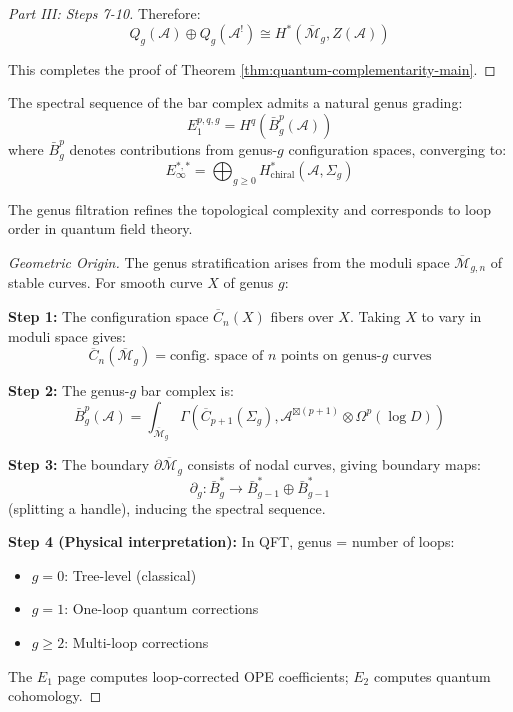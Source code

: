 \begin{proof}[Part III: Steps 7-10]
Therefore:
\begin{equation}
\boxed{Q_g(\mathcal{A}) \oplus Q_g(\mathcal{A}^!) \cong H^*(\overline{\mathcal{M}}_g, 
Z(\mathcal{A}))}
\end{equation}

This completes the proof of Theorem \ref{thm:quantum-complementarity-main}. \qedhere

\end{proof}

\begin{theorem}\label{thm:ss-genus-stratification}
The spectral sequence of the bar complex admits a natural genus grading:
$$E_1^{p,q,g} = H^q\left(\bar{B}^p_g(\mathcal{A})\right)$$
where $\bar{B}^p_g$ denotes contributions from genus-$g$ configuration spaces, converging to:
$$E_\infty^{*,*} = \bigoplus_{g \geq 0} H^*_{\text{chiral}}(\mathcal{A}, \Sigma_g)$$

The genus filtration refines the topological complexity and corresponds to loop order 
in quantum field theory.
\end{theorem}

\begin{proof}[Geometric Origin]
The genus stratification arises from the moduli space $\overline{\mathcal{M}}_{g,n}$ of 
stable curves. For smooth curve $X$ of genus $g$:

\textbf{Step 1:} The configuration space $\overline{C}_n(X)$ fibers over $X$. Taking $X$ 
to vary in moduli space gives:
$$\overline{C}_n(\overline{\mathcal{M}}_g) = \text{config. space of } n \text{ points on genus-}g \text{ curves}$$

\textbf{Step 2:} The genus-$g$ bar complex is:
$$\bar{B}^p_g(\mathcal{A}) = \int_{\overline{\mathcal{M}}_g} \Gamma(\overline{C}_{p+1}(\Sigma_g), 
\mathcal{A}^{\boxtimes (p+1)} \otimes \Omega^p(\log D))$$

\textbf{Step 3:} The boundary $\partial \overline{\mathcal{M}}_g$ consists of nodal curves, 
giving boundary maps:
$$\partial_g: \bar{B}^*_g \to \bar{B}^*_{g-1} \oplus \bar{B}^*_{g-1}$$
(splitting a handle), inducing the spectral sequence.

\textbf{Step 4 (Physical interpretation):} In QFT, genus = number of loops:
\begin{itemize}
\item $g=0$: Tree-level (classical)
\item $g=1$: One-loop quantum corrections
\item $g \geq 2$: Multi-loop corrections
\end{itemize}

The $E_1$ page computes loop-corrected OPE coefficients; $E_2$ computes quantum cohomology.
\end{proof}

